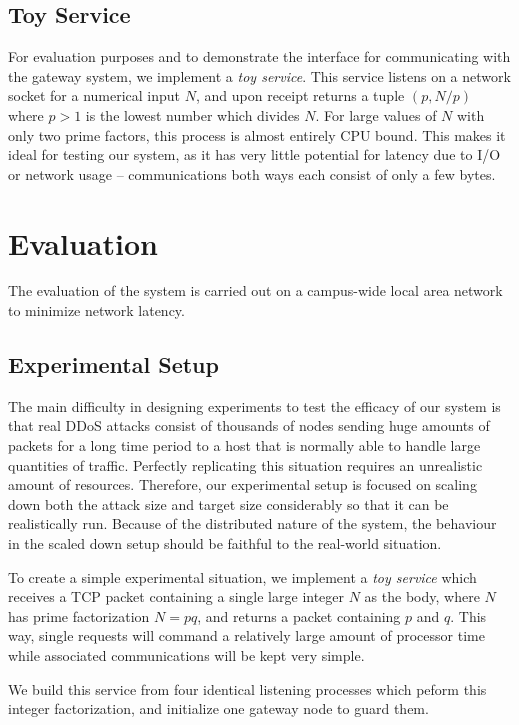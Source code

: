 \documentclass[twocolumn]{article}
\begin{document}
\subsection{Toy Service}

For evaluation purposes and to demonstrate the interface for communicating with the gateway system, we implement a \emph{toy service}. This service listens on a network socket for a numerical input $N$, and upon receipt returns a tuple $(p,N/p)$ where $p>1$ is the lowest number which divides $N$. For large values of $N$ with only two prime factors, this process is almost entirely CPU bound. This makes it ideal for testing our system, as it has very little potential for latency due to I/O or network usage -- communications both ways each consist of only a few bytes.

\section{Evaluation}

The evaluation of the system is carried out on a campus-wide local area network to minimize network latency.

\subsection{Experimental Setup}

The main difficulty in designing experiments to test the efficacy of our system is that real DDoS attacks consist of thousands of nodes sending huge amounts of packets for a long time period to a host that is normally able to handle large quantities of traffic. Perfectly replicating this situation requires an unrealistic amount of resources. Therefore, our experimental setup is focused on scaling down both the attack size and target size considerably so that it can be realistically run. Because of the distributed nature of the system, the behaviour in the scaled down setup should be faithful to the real-world situation.

To create a simple experimental situation, we implement a \emph{toy service} which receives a TCP packet containing a single large integer $N$ as the body, where $N$ has prime factorization $N=pq$, and returns a packet containing $p$ and $q$. This way, single requests will command a relatively large amount of processor time while associated communications will be kept very simple.

We build this service from four identical listening processes which peform this integer factorization, and initialize one gateway node to guard them.
\end{document}
